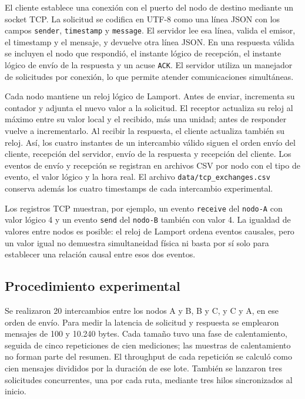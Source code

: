 El cliente establece una conexión con el puerto del nodo de destino mediante
un socket TCP. La solicitud se codifica en UTF-8 como una línea JSON con los
campos \texttt{sender}, \texttt{timestamp} y \texttt{message}. El servidor lee
esa línea, valida el emisor, el timestamp y el mensaje, y devuelve otra línea
JSON. En una respuesta válida se incluyen el nodo que respondió, el instante
lógico de recepción, el instante lógico de envío de la respuesta y un acuse
\texttt{ACK}. El servidor utiliza un manejador de solicitudes por conexión,
lo que permite atender comunicaciones simultáneas.

Cada nodo mantiene un reloj lógico de Lamport. Antes de enviar, incrementa su
contador y adjunta el nuevo valor a la solicitud. El receptor actualiza su
reloj al máximo entre su valor local y el recibido, más una unidad; antes de
responder vuelve a incrementarlo. Al recibir la respuesta, el cliente
actualiza también su reloj. Así, los cuatro instantes de un intercambio
válido siguen el orden envío del cliente, recepción del servidor, envío de la
respuesta y recepción del cliente. Los eventos de envío y recepción se
registran en archivos CSV por nodo con el tipo de evento, el valor lógico y
la hora real. El archivo \texttt{data/tcp\_exchanges.csv} conserva además
los cuatro timestamps de cada intercambio experimental.

Los registros TCP muestran, por ejemplo, un evento \texttt{receive} del
\texttt{nodo-A} con valor lógico 4 y un evento \texttt{send} del
\texttt{nodo-B} también con valor 4. La igualdad de valores entre nodos es
posible: el reloj de Lamport ordena eventos causales, pero un valor igual no
demuestra simultaneidad física ni basta por sí solo para establecer una
relación causal entre esos dos eventos.

\subsection{Procedimiento experimental}

Se realizaron 20 intercambios entre los nodos A y B, B y C, y C y A, en ese
orden de envío. Para medir la latencia de
solicitud y respuesta se emplearon mensajes de 100 y 10.240 bytes. Cada
tamaño tuvo una fase de calentamiento, seguida de cinco repeticiones de cien
mediciones; las muestras de calentamiento no forman parte del resumen. El
throughput de cada repetición se calculó como cien mensajes divididos por la
duración de ese lote. También se lanzaron tres solicitudes concurrentes, una
por cada ruta, mediante tres hilos sincronizados al inicio.

